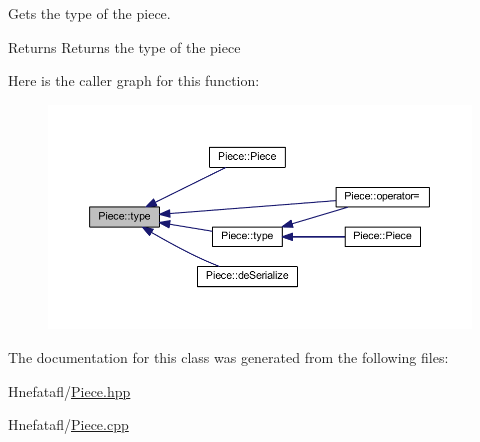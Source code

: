 Gets the type of the piece. 

\begin{DoxyReturn}{Returns}
Returns the type of the piece 
\end{DoxyReturn}


Here is the caller graph for this function\-:
\nopagebreak
\begin{figure}[H]
\begin{center}
\leavevmode
\includegraphics[width=350pt]{class_piece_a64d970cf7c3d34014d8a36cc3bd3c908_icgraph}
\end{center}
\end{figure}




The documentation for this class was generated from the following files\-:\begin{DoxyCompactItemize}
\item 
Hnefatafl/\hyperlink{_piece_8hpp}{Piece.\-hpp}\item 
Hnefatafl/\hyperlink{_piece_8cpp}{Piece.\-cpp}\end{DoxyCompactItemize}

